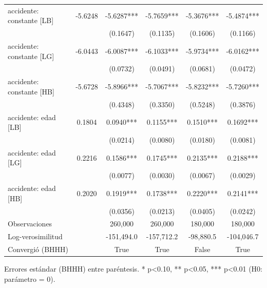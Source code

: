 \begin{table}[htbp]
\begin{tabular}{lccccc}
accidente: constante [LB] & -5.6248 & -5.6287*** & -5.7659*** & -5.3676*** & -5.4874*** \\
 &  & (0.1647) & (0.1135) & (0.1606) & (0.1166) \\
accidente: constante [LG] & -6.0443 & -6.0087*** & -6.1033*** & -5.9734*** & -6.0162*** \\
 &  & (0.0732) & (0.0491) & (0.0681) & (0.0472) \\
accidente: constante [HB] & -5.6728 & -5.8966*** & -5.7067*** & -5.8232*** & -5.7260*** \\
 &  & (0.4348) & (0.3350) & (0.5248) & (0.3876) \\
accidente: edad [LB] & 0.1804 & 0.0940*** & 0.1155*** & 0.1510*** & 0.1692*** \\
 &  & (0.0214) & (0.0080) & (0.0180) & (0.0081) \\
accidente: edad [LG] & 0.2216 & 0.1586*** & 0.1745*** & 0.2135*** & 0.2188*** \\
 &  & (0.0077) & (0.0030) & (0.0067) & (0.0029) \\
accidente: edad [HB] & 0.2020 & 0.1919*** & 0.1738*** & 0.2220*** & 0.2141*** \\
 &  & (0.0356) & (0.0213) & (0.0405) & (0.0242) \\
Observaciones &  & 260,000 & 260,000 & 180,000 & 180,000 \\
Log-verosimilitud &  & -151,494.0 & -157,712.2 & -98,880.5 & -104,046.7 \\
Convergió (BHHH) &  & True & True & False & True \\
\bottomrule
\end{tabular}
\par\smallskip\footnotesize Errores estándar (BHHH) entre paréntesis. * p<0.10, ** p<0.05, *** p<0.01 (H0: parámetro = 0).
\end{table}
